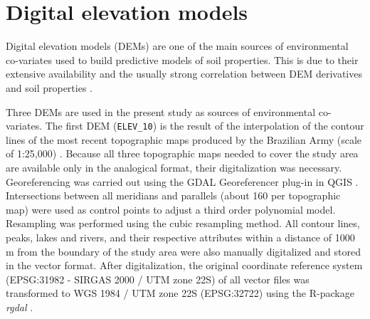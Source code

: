 
\tocless\section{Digital elevation models}
\label{sec:dem}

Digital elevation models (DEMs) are one of the main sources of environmental co-variates used to build predictive models of soil properties. This is due to their extensive availability and the usually strong correlation between DEM derivatives and soil properties \cite{BishopEtAl2001, Grunwald2009}.

Three DEMs are used in the present study as sources of environmental co-variates. The first DEM (\texttt{ELEV\_10}) is the result of the interpolation of the contour lines of the most recent topographic maps produced by the Brazilian Army (scale of 1:25,000) \cite{DSG1980, DSG1992, DSG1992a}. Because all three topographic maps needed to cover the study area are available only in the analogical format, their digitalization was necessary. Georeferencing was carried out using the GDAL Georeferencer plug-in in QGIS \cite{GDAL2013, QGIS2013}. Intersections between all meridians and parallels (about 160 per topographic map) were used as control points to adjust a third order polynomial model. Resampling was performed using the cubic resampling method. All contour lines, peaks, lakes and rivers, and their respective attributes within a distance of 1000 m from the boundary of the study area were also manually digitalized and stored in the vector format. After digitalization, the original coordinate reference system (EPSG:31982 - SIRGAS 2000 / UTM zone 22S) of all vector files was transformed to WGS 1984 / UTM zone 22S (EPSG:32722) using the R-package \textit{rgdal} \cite{BivandEtAl2013a}.

